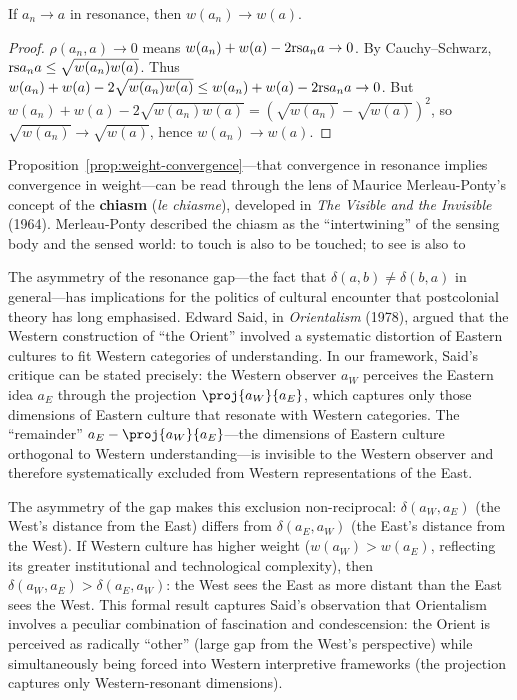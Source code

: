 \begin{proposition}
\label{prop:weight-convergence}
If $a_n \to a$ in resonance, then $w(a_n) \to w(a)$.
\end{proposition}

\begin{proof}
$\rho(a_n, a) \to 0$ means $w(a_n) + w(a) - 2\mathrm{rs}{a_n}{a} \to 0$.
By Cauchy--Schwarz, $\mathrm{rs}{a_n}{a} \leq \sqrt{w(a_n) w(a)}$.
Thus $w(a_n) + w(a) - 2\sqrt{w(a_n)w(a)} \leq w(a_n) + w(a) - 2\mathrm{rs}{a_n}{a} \to 0$.
But $w(a_n) + w(a) - 2\sqrt{w(a_n)w(a)} = (\sqrt{w(a_n)} - \sqrt{w(a)})^2$,
so $\sqrt{w(a_n)} \to \sqrt{w(a)}$, hence $w(a_n) \to w(a)$.
\end{proof}

\begin{interpretation}
\label{interp:ch11:merleau_ponty_chiasm}
Proposition~\ref{prop:weight-convergence}---that convergence in resonance
implies convergence in weight---can be read through the lens of
Maurice Merleau-Ponty's concept of the \textbf{chiasm} (\emph{le
chiasme}), developed in \emph{The Visible and the Invisible} (1964).
Merleau-Ponty described the chiasm as the ``intertwining'' of the sensing
body and the sensed world: to touch is also to be touched; to see is also to

\begin{interpretation}
\label{interp:ch11:distance_colonialism}
The asymmetry of the resonance gap---the fact that $\delta(a,b) \neq
\delta(b,a)$ in general---has implications for the politics of cultural
encounter that postcolonial theory has long emphasised.  Edward Said, in
\emph{Orientalism} (1978), argued that the Western construction of ``the
Orient'' involved a systematic distortion of Eastern cultures to fit
Western categories of understanding.  In our framework, Said's critique
can be stated precisely: the Western observer $a_W$ perceives the Eastern
idea $a_E$ through the projection $\proj{a_W}{a_E}$, which captures only
those dimensions of Eastern culture that resonate with Western categories.
The ``remainder'' $a_E - \proj{a_W}{a_E}$---the dimensions of Eastern
culture orthogonal to Western understanding---is invisible to the Western
observer and therefore systematically excluded from Western representations
of the East.

The asymmetry of the gap makes this exclusion non-reciprocal:
$\delta(a_W, a_E)$ (the West's distance from the East) differs from
$\delta(a_E, a_W)$ (the East's distance from the West).  If Western culture
has higher weight ($w(a_W) > w(a_E)$, reflecting its greater institutional
and technological complexity), then $\delta(a_W, a_E) > \delta(a_E, a_W)$:
the West sees the East as more distant than the East sees the West.  This
formal result captures Said's observation that Orientalism involves a
peculiar combination of fascination and condescension: the Orient is
perceived as radically ``other'' (large gap from the West's perspective)
while simultaneously being forced into Western interpretive frameworks
(the projection captures only Western-resonant dimensions).
\end{interpretation}



\end{interpretation}
